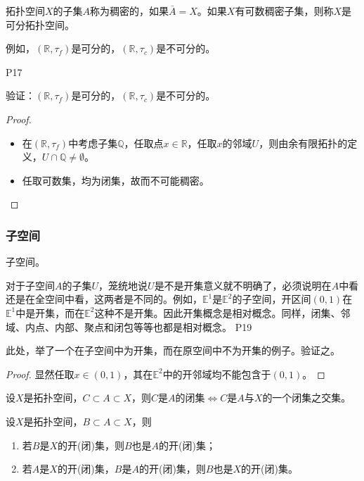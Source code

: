 \original
{
    拓扑空间$X$的子集$A$称为稠密的，如果$\bar{A}=X$。如果$X$有可数稠密子集，则称$X$是可分拓扑空间。
    \par
    例如，$(\mathbb{R},\tau_f)$是可分的，$(\mathbb{R},\tau_c)$是不可分的。
}
{P17}

\begin{proposition}
    验证：$(\mathbb{R},\tau_f)$是可分的，$(\mathbb{R},\tau_c)$是不可分的。
\end{proposition}

\begin{proof}
    \begin{itemize}
        \item 在$(\mathbb{R},\tau_f)$中考虑子集$\mathbb{Q}$，任取点$x\in \mathbb{R}$，任取$x$的邻域$U$，则由余有限拓扑的定义，$U\cap \mathbb{Q}\neq \emptyset$。
        \item 任取可数集，均为闭集，故而不可能稠密。
    \end{itemize}
\end{proof}

\subsubsection{子空间}

\begin{definition}
    子空间。
\end{definition}

\original
{
    对于子空间$A$的子集$U$，笼统地说$U$是不是开集意义就不明确了，必须说明在$A$中看还是在全空间中看，这两者是不同的。例如，$\mathbb{E}^1$是$\mathbb{E}^2$的子空间，开区间$(0,1)$在$\mathbb{E}^1$中是开集，而在$\mathbb{E}^2$这种不是开集。因此开集概念是相对概念。同样，闭集、邻域、内点、内部、聚点和闭包等等也都是相对概念。
}
{P19}

\begin{proposition}
    此处，举了一个在子空间中为开集，而在原空间中不为开集的例子。验证之。
\end{proposition}

\begin{proof}
    显然任取$x\in (0,1)$，其在$\mathbb{E}^2$中的开邻域均不能包含于$(0,1)$。
\end{proof}

\begin{proposition}
    设$X$是拓扑空间，$C\subset A\subset X$，则$C$是$A$的闭集$\Leftrightarrow$$C$是$A$与$X$的一个闭集之交集。
\end{proposition}

\begin{proposition}
    设$X$是拓扑空间，$B\subset A\subset X$，则
    \begin{enumerate}
        \item 若$B$是$X$的开(闭)集，则$B$也是$A$的开(闭)集；
        \item 若$A$是$X$的开(闭)集，$B$是$A$的开(闭)集，则$B$也是$X$的开(闭)集。
    \end{enumerate}
\end{proposition}


